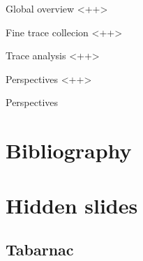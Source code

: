 \documentclass[xcolor={usenames,dvipsnames},hyperref={pdfusetitle}]{beamer}
\begin{document}
\begin{frame}{Global overview}
    \cite{Beniamine15TABARNAC}
    <++>
\end{frame}

\begin{frame}{Fine trace collecion}
    \cite{Beniamine16Moca}
    <++>
\end{frame}

\begin{frame}{Trace analysis}
    <++>
\end{frame}

\begin{frame}{Perspectives}
    <++>
\end{frame}

\setcounter{finalframe}{\value{framenumber}}

\begin{frame}{Perspectives}
\end{frame}

\section*{Bibliography}
%



\section*{Hidden slides}

\subsection*{Tabarnac}
\end{document}
